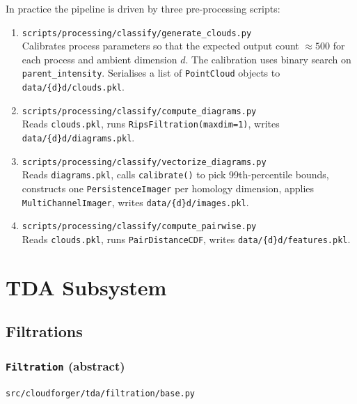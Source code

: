 \documentclass[11pt, a4paper]{article}
\newcommand{\code}[1]{\texttt{#1}}
\newcommand{\pyfile}[1]{\texttt{\small #1}}
\newcommand{\typename}[1]{\textbf{\texttt{#1}}}
\begin{document}
In practice the pipeline is driven by three pre-processing scripts:

\begin{enumerate}
  \item \pyfile{scripts/processing/classify/generate\_clouds.py}\\
        Calibrates process parameters so that the expected output count
        $\approx 500$ for each process and ambient dimension $d$.
        The calibration uses binary search on \code{parent\_intensity}.
        Serialises a list of \code{PointCloud} objects to
        \pyfile{data/\{d\}d/clouds.pkl}.

  \item \pyfile{scripts/processing/classify/compute\_diagrams.py}\\
        Reads \code{clouds.pkl}, runs \code{RipsFiltration(maxdim=1)},
        writes \pyfile{data/\{d\}d/diagrams.pkl}.

  \item \pyfile{scripts/processing/classify/vectorize\_diagrams.py}\\
        Reads \code{diagrams.pkl}, calls \code{calibrate()} to pick
        99th-percentile bounds, constructs one \code{PersistenceImager}
        per homology dimension, applies \code{MultiChannelImager},
        writes \pyfile{data/\{d\}d/images.pkl}.

  \item \pyfile{scripts/processing/classify/compute\_pairwise.py}\\
        Reads \code{clouds.pkl}, runs \code{PairDistanceCDF},
        writes \pyfile{data/\{d\}d/features.pkl}.
\end{enumerate}

\section{TDA Subsystem}
\label{sec:tda}

\subsection{Filtrations}

\subsubsection{\typename{Filtration} (abstract)}
\pyfile{src/cloudforger/tda/filtration/base.py}
\end{document}
